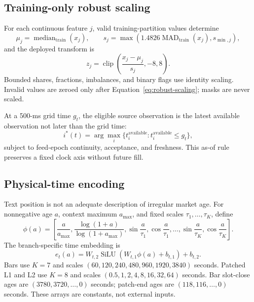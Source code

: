 \documentclass[10pt,letterpaper]{article}
\numberwithin{equation}{section}
\newcommand{\SiLU}{\operatorname{SiLU}}
\theoremstyle{definition}
\theoremstyle{remark}
\begin{document}
\subsection{Training-only robust scaling}

For each continuous feature $j$, valid training-partition values determine
\begin{equation}
\mu_j=\operatorname{median}_{\mathrm{train}}(x_j),\qquad
s_j=\max\!\left(1.4826\operatorname{MAD}_{\mathrm{train}}(x_j),s_{\min,j}\right),
\label{eq:scaler-fit}
\end{equation}
and the deployed transform is
\begin{equation}
z_j=\operatorname{clip}\!\left(\frac{x_j-\mu_j}{s_j},-8,8\right).
\label{eq:robust-scaling}
\end{equation}
Bounded shares, fractions, imbalances, and binary flags use identity scaling.
Invalid values are zeroed only after Equation~\eqref{eq:robust-scaling}; masks
are never scaled.

At a 500-ms grid time $g_t$, the eligible source observation is the latest
available observation not later than the grid time:
\begin{equation}
i^*(t)=\arg\max_i\{t_i^{\mathrm{available}}:
t_i^{\mathrm{available}}\le g_t\},
\label{eq:asof-sampling}
\end{equation}
subject to feed-epoch continuity, acceptance, and freshness. This as-of rule
preserves a fixed clock axis without future fill.

\subsection{Physical-time encoding}

Text position is not an adequate description of irregular market age. For
nonnegative age $a$, context maximum $a_{\max}$, and fixed scales
$\tau_1,\ldots,\tau_K$, define
\begin{equation}
\phi(a)=\left[
\frac{a}{a_{\max}},
\frac{\log(1+a)}{\log(1+a_{\max})},
\sin\frac{a}{\tau_1},\cos\frac{a}{\tau_1},\ldots,
\sin\frac{a}{\tau_K},\cos\frac{a}{\tau_K}
\right].
\label{eq:time-features}
\end{equation}
The branch-specific time embedding is
\begin{equation}
e_t(a)=W_{t,2}\SiLU(W_{t,1}\phi(a)+b_{t,1})+b_{t,2}.
\label{eq:time-mlp}
\end{equation}
Bars use $K=7$ and scales $(60,120,240,480,960,1920,3840)$ seconds.
Patched L1 and L2 use $K=8$ and scales
$(0.5,1,2,4,8,16,32,64)$ seconds. Bar slot-close ages are
$(3780,3720,\ldots,0)$ seconds; patch-end ages are
$(118,116,\ldots,0)$ seconds. These arrays are constants, not external inputs.
\end{document}
